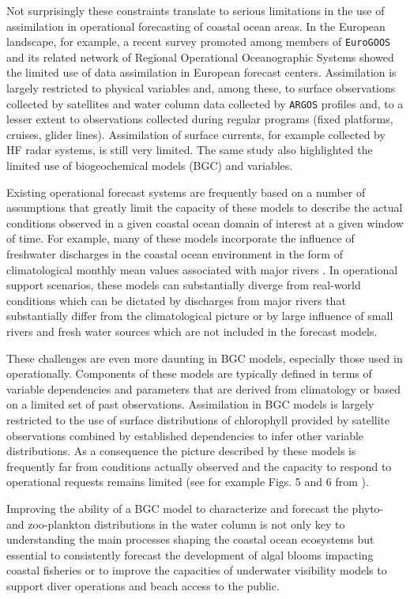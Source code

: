 Not surprisingly these constraints translate to serious limitations in
the use of assimilation in operational forecasting of coastal ocean
areas. In the European landscape, for example, a recent survey
promoted among members of \texttt{EuroGOOS} and its related network of
Regional Operational Oceanographic Systems \cite{capet2020} showed the
limited use of data assimilation in European forecast
centers. Assimilation is largely restricted to physical variables and,
among these, to surface observations collected by satellites and water
column data collected by \texttt{ARGOS} profiles and, to a lesser
extent to observations collected during regular programs (fixed
platforms, cruises, glider lines). Assimilation of surface currents,
for example collected by HF radar systems, is still very limited. The
same study also highlighted the limited use of biogeochemical models
(BGC) and variables.
 
Existing operational forecast systems are frequently based on a number
of assumptions that greatly limit the capacity of these models to
describe the actual conditions observed in a given coastal ocean
domain of interest at a given window of time. For example, many of
these models incorporate the influence of freshwater discharges in the
coastal ocean environment in the form of climatological monthly mean
values associated with major rivers \cite{marta012}.  In operational
support scenarios, these models can substantially diverge from
real-world conditions which can be dictated by discharges from major
rivers that substantially differ from the climatological picture or by
large influence of small rivers and fresh water sources which are not
included in the forecast models.
 
These challenges are even more daunting in BGC models, especially
those used in operationally. Components of these models are typically
defined in terms of variable dependencies and parameters that are
derived from climatology or based on a limited set of past
observations. Assimilation in BGC models is largely restricted to the
use of surface distributions of chlorophyll provided by satellite
observations combined by established dependencies to infer other
variable distributions. As a consequence the picture described by
these models is frequently far from conditions actually observed and
the capacity to respond to operational requests remains limited (see
for example Figs. 5 and 6 from \cite{marta012}).
 
Improving the ability of a BGC model to characterize and forecast the
phyto- and zoo-plankton distributions in the water column is not only
key to understanding the main processes shaping the coastal ocean
ecosystems but essential to consistently forecast the development of
algal blooms impacting coastal fisheries or to improve the capacities
of underwater visibility models to support diver operations and beach
access to the public.
 
